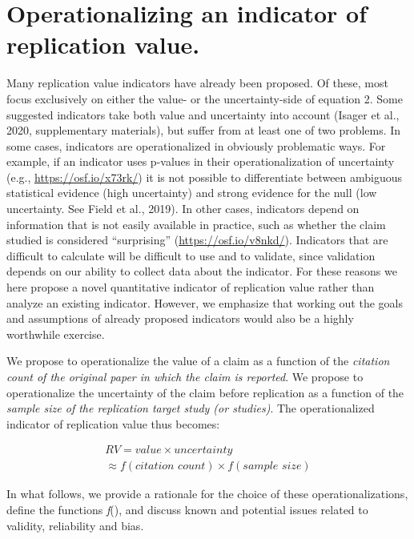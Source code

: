 \documentclass[
  english,
  man,floatsintext]{apa6}
\begin{document}
\hypertarget{operationalizing-an-indicator-of-replication-value.}{%
\section{Operationalizing an indicator of replication value.}\label{operationalizing-an-indicator-of-replication-value.}}

Many replication value indicators have already been proposed. Of these, most focus exclusively on either the value- or the uncertainty-side of equation 2. Some suggested indicators take both value and uncertainty into account (Isager et al., 2020, supplementary materials), but suffer from at least one of two problems. In some cases, indicators are operationalized in obviously problematic ways. For example, if an indicator uses p-values in their operationalization of uncertainty (e.g., \url{https://osf.io/x73rk/}) it is not possible to differentiate between ambiguous statistical evidence (high uncertainty) and strong evidence for the null (low uncertainty. See Field et al., 2019). In other cases, indicators depend on information that is not easily available in practice, such as whether the claim studied is considered ``surprising'' (\url{https://osf.io/v8nkd/}). Indicators that are difficult to calculate will be difficult to use and to validate, since validation depends on our ability to collect data about the indicator. For these reasons we here propose a novel quantitative indicator of replication value rather than analyze an existing indicator. However, we emphasize that working out the goals and assumptions of already proposed indicators would also be a highly worthwhile exercise.

We propose to operationalize the value of a claim as a function of the \emph{citation count of the original paper in which the claim is reported}. We propose to operationalize the uncertainty of the claim before replication as a function of the \emph{sample size of the replication target study (or studies)}. The operationalized indicator of replication value thus becomes:

\begin{equation} 
  \tag{3}
  \begin{split} 
  RV=value\times uncertainty \\
  \approx f(\textit{citation count}) \times f(\textit{sample size})
  \end{split}
  \label{eq:3}
\end{equation}

In what follows, we provide a rationale for the choice of these operationalizations, define the functions \emph{f}(), and discuss known and potential issues related to validity, reliability and bias.
\end{document}
